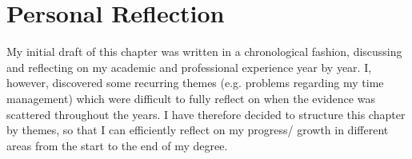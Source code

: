 \chapter{Personal Reflection} %

\label{Chapter4} %



My initial draft of this chapter was written in a chronological fashion, discussing and reflecting on my academic and professional experience year by year.
I, however, discovered some recurring themes (e.g. problems regarding my time management) which were difficult to fully reflect on when the evidence was scattered throughout the years.
I have therefore decided to structure this chapter by themes, so that I can efficiently reflect on my progress/ growth in different areas from the start to the end of my degree.







